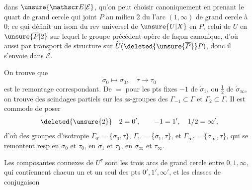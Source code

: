 dans $\unsure{\mathscr E|\mathcal E}$, qu'on peut choisir canoniquement en prenant le quart de grand cercle qui joint $P$ au milieu 2 du  l'arc $(1,\infty)$ de grand cercle  à 0; ce qui définit un isom du rev universel de $\unsure{U|X}$ en $P$,  celui de $U$ en $\unsure{\overline P|2}$ sur lequel le groupe précédent opère de façon canonique, d'où aussi par transport de structure sur $\widetilde U(\deleted{\unsure{\overline P}}P)$, donc il s'envoie dans $\mathscr E$.

On trouve que
\[
\dot\sigma_0\mapsto\sigma_0,\quad\dot\tau\to\tau_0
\]
est le remontage correspondant. De $=$ pour les pts fixes $-1$ de $\dot\sigma_1$, ou $\frac12$ de $\dot\sigma_\infty$, on trouve des scindages partiels sur les ss-groupes des   $\Gamma_{-1}\subset\Gamma$ et $\Gamma_2\subset\Gamma$. Il est commode de poser
\[
\deleted{\unsure{2}}\quad 2=0',\qquad -1=1',\quad 1/2=\infty',
\]
d'où des groupes d'isotropie $\Gamma_{0'}=\{\dot\sigma_0,\tau\}$, $\Gamma_{1'}=\{\dot\sigma_1,\tau\}$, et $\Gamma_{\infty'}=\{\dot\sigma_\infty,\tau\}$, qui se remontent resp en $\sigma_0$ et $\tau_0$, en $\sigma_1$ et $\tau_1$, en $\sigma_\infty$ et $\tau_\infty$.

Les composantes connexes de $U^\tau$ sont les trois arcs de grand cercle entre $0,1,\infty$, qui contiennent chacun un  et un seul des pts $0',1',\infty'$, et les classes de conjugaison
